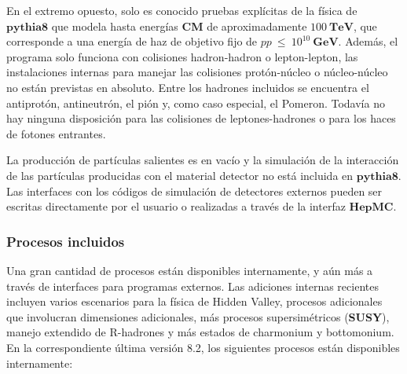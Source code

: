 En el extremo opuesto, solo es conocido pruebas explícitas de la física de $\mathbf{pythia8}$ que modela hasta energías \textbf{CM} de aproximadamente $100 ~ \mathbf{TeV}$, que corresponde a una energía de haz de objetivo fijo de $pp~\leq~10^{10} ~ \mathbf{GeV}$. Además, el programa solo funciona con colisiones hadron-hadron o lepton-lepton, las instalaciones internas para manejar las colisiones protón-núcleo o núcleo-núcleo no están previstas en absoluto. Entre los hadrones incluidos se encuentra el antiprotón, antineutrón, el pión y, como caso especial, el Pomeron. Todavía no hay ninguna disposición para las colisiones de leptones-hadrones o para los haces de fotones entrantes.

La producción de partículas salientes es en vacío y la simulación de la interacción de las partículas producidas con el material detector no está incluida en $\mathbf{pythia8}$. Las interfaces con los códigos de simulación de detectores externos pueden ser escritas directamente por el usuario o realizadas a través de la interfaz $\mathbf{HepMC}$.

\subsubsection{Procesos incluidos}

Una gran cantidad de procesos están disponibles internamente, y aún más a través de interfaces para programas externos. Las adiciones internas recientes incluyen varios escenarios para la física de Hidden Valley, procesos adicionales que involucran dimensiones adicionales, más procesos supersimétricos (\textbf{SUSY}), manejo extendido de R-hadrones y más estados de charmonium y bottomonium. En la correspondiente última versión 8.2, los siguientes procesos están disponibles internamente:

